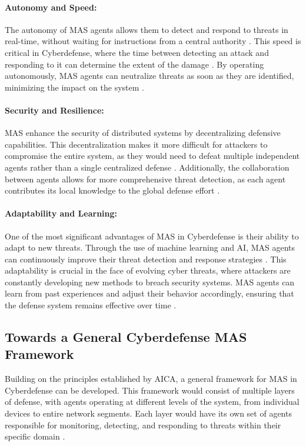 \paragraph{Autonomy and Speed:}
The autonomy of MAS agents allows them to detect and respond to threats in real-time, without waiting for instructions from a central authority \cite{shamshirband2014cooperative}. This speed is critical in Cyberdefense, where the time between detecting an attack and responding to it can determine the extent of the damage \cite{liao2013intrusion}. By operating autonomously, MAS agents can neutralize threats as soon as they are identified, minimizing the impact on the system \cite{shamshirband2018computational}.

\paragraph{Security and Resilience:}
MAS enhance the security of distributed systems by decentralizing defensive capabilities. This decentralization makes it more difficult for attackers to compromise the entire system, as they would need to defeat multiple independent agents rather than a single centralized defense \cite{jajodia2005topological}. Additionally, the collaboration between agents allows for more comprehensive threat detection, as each agent contributes its local knowledge to the global defense effort \cite{buczak2016survey}.

\paragraph{Adaptability and Learning:}
One of the most significant advantages of MAS in Cyberdefense is their ability to adapt to new threats. Through the use of machine learning and AI, MAS agents can continuously improve their threat detection and response strategies \cite{buczak2016survey}. This adaptability is crucial in the face of evolving cyber threats, where attackers are constantly developing new methods to breach security systems. MAS agents can learn from past experiences and adjust their behavior accordingly, ensuring that the defense system remains effective over time \cite{debar1999towards}.

\subsection{Towards a General Cyberdefense MAS Framework}

Building on the principles established by AICA, a general framework for MAS in Cyberdefense can be developed. This framework would consist of multiple layers of defense, with agents operating at different levels of the system, from individual devices to entire network segments. Each layer would have its own set of agents responsible for monitoring, detecting, and responding to threats within their specific domain \cite{bou-harb2017cyber}.

